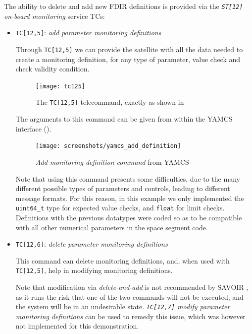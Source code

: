 \documentclass[a4paper,nobib]{tufte-book}
\begin{document}
	The ability to delete and add new \acs{FDIR} definitions is provided via the \emph{\texttt{ST[12]} on-board monitoring} service \acsp{TC}:
	
	\begin{itemize}
	\item \texttt{TC[12,5]}: \emph{add parameter monitoring definitions}
	
	Through \texttt{TC[12,5]} we can provide the satellite with all the data needed to create a monitoring definition, for any type of parameter, value check and check validity condition.
	
	\begin{figure}[h]
		\texttt{[image: tc125]}
		\caption{The \texttt{TC[12,5]} telecommand, exactly as shown in \autocite{ECSS-E-ST-70-41C}}
	\end{figure}
	
	The arguments to this command can be given from within the \acs{YAMCS} interface ().
	
	\begin{figure}[h]
		\centering
		\texttt{[image: screenshots/yamcs\_add\_definition]}
		\caption{\emph{Add monitoring definition command} from \acs{YAMCS}}
		\label{fig:yamcs_add_definition}
	\end{figure}
	
	Note that using this command presents some difficulties, due to the many different possible types of parameters and controls, leading to different message formats. For this reason, in this example we only implemented the \texttt{uint64_t} type for expected value checks, and \texttt{float} for limit checks. Definitions with the previous datatypes were coded so as to be compatible with all other numerical parameters in the space segment code.
	
	\pagebreak[4]
	\item \texttt{TC[12,6]}: \emph{delete parameter monitoring definitions}
		
		This command can delete monitoring definitions, and, when used with \texttt{TC[12,5]}, help in modifying monitoring definitions.
		
		Note that modification via \emph{delete-and-add} is not recommended by \acs{SAVOIR} \autocite{SAVOIR-HB-003}, as it runs the risk that one of the two commands will not be executed, and the system will be in an undesirable state. \emph{\texttt{TC[12,7]} modify parameter monitoring definitions} can be used to remedy this issue, which was however not implemented for this demonstration.
		
	\end{itemize}
	
\end{document}
